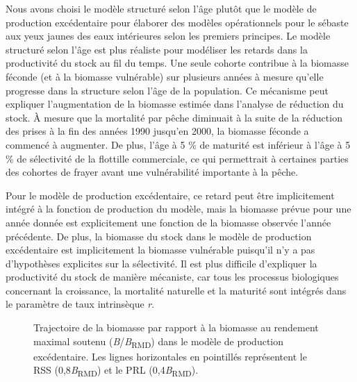 \documentclass[french,11pt]{book}
\begin{document}
Nous avons choisi le modèle structuré selon l'âge plutôt que le modèle de production excédentaire pour élaborer des modèles opérationnels pour le sébaste aux yeux jaunes des eaux intérieures selon les premiers principes. Le modèle structuré selon l'âge est plus réaliste pour modéliser les retards dans la productivité du stock au fil du temps. Une seule cohorte contribue à la biomasse féconde (et à la biomasse vulnérable) sur plusieurs années à mesure qu'elle progresse dans la structure selon l'âge de la population. Ce mécanisme peut expliquer l'augmentation de la biomasse estimée dans l'analyse de réduction du stock. À mesure que la mortalité par pêche diminuait à la suite de la réduction des prises à la fin des années 1990 jusqu'en 2000, la biomasse féconde a commencé à augmenter. De plus, l'âge à 5 \% de maturité est inférieur à l'âge à 5 \% de sélectivité de la flottille commerciale, ce qui permettrait à certaines parties des cohortes de frayer avant une vulnérabilité importante à la pêche.

Pour le modèle de production excédentaire, ce retard peut être implicitement intégré à la fonction de production du modèle, mais la biomasse prévue pour une année donnée est explicitement une fonction de la biomasse observée l'année précédente. De plus, la biomasse du stock dans le modèle de production excédentaire est implicitement la biomasse vulnérable puisqu'il n'y a pas d'hypothèses explicites sur la sélectivité. Il est plus difficile d'expliquer la productivité du stock de manière mécaniste, car tous les processus biologiques concernant la croissance, la mortalité naturelle et la maturité sont intégrés dans le paramètre de taux intrinsèque \emph{r}.


\begin{figure}[htb]

{\centering {} 

}

\caption{Trajectoire de la biomasse par rapport à la biomasse au rendement maximal soutenu (\emph{B}/\emph{B}\textsubscript{RMD}) dans le modèle de production excédentaire. Les lignes horizontales en pointillés représentent le RSS (0,8\emph{B}\textsubscript{RMD}) et le PRL (0,4\emph{B}\textsubscript{RMD}).}\label{fig:spm-biomass}
\end{figure}
\end{document}
